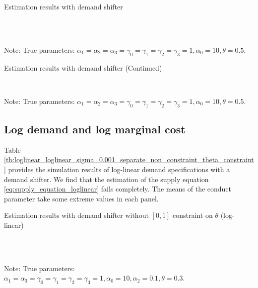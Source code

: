 \documentclass[11pt, a4paper]{article}
\begin{document}
\begin{table}[!htbp]
  \begin{center}
      \caption{Estimation results with demand shifter}
      \label{tb:linear_linear_sigma_1} 
      \subfloat[$\sigma=0.001$]{}\\
      \subfloat[$\sigma=0.5$]{}\\
  \end{center}\footnotesize
  Note: True parameters: $\alpha_1 = \alpha_2 = \alpha_3 = \gamma_0 = \gamma_1 = \gamma_2  = \gamma_3 = 1, \alpha_0 = 10, \theta = 0.5.$
\end{table} 

\begin{table}[!htbp]
  \ContinuedFloat  %
  \begin{center}
      \caption{Estimation results with demand shifter (Continued)}
      \label{tb:linear_linear_sigma_1} 
      \subfloat[$\sigma=1.0$]{}\\
    \subfloat[$\sigma=2.0$]{}
  \end{center}\footnotesize
  Note: True parameters: $\alpha_1 = \alpha_2 = \alpha_3 = \gamma_0 = \gamma_1 = \gamma_2  = \gamma_3 = 1, \alpha_0 = 10, \theta = 0.5.$
\end{table} 


\subsection{Log demand and log marginal cost}
Table \ref{tb:loglinear_loglinear_sigma_0.001_separate_non_constraint_theta_constraint} provides the simulation results of log-linear demand specifications with a demand shifter. 
We find that the estimation of the supply equation \eqref{eq:supply_equation_loglinear} fails completely.
The means of the conduct parameter take some extreme values in each panel.

\begin{table}[!htbp]
  \begin{center}
      \caption{Estimation results with demand shifter without $[0,1]$ constraint on $\theta$ (log-linear)}
      \label{tb:loglinear_loglinear_sigma_0.001_separate_non_constraint_non_constraint} 
      \subfloat[$\sigma=0.001$]{}\\
      \subfloat[$\sigma=0.5$]{}\\
  \end{center}\footnotesize
  Note: True parameters: $\alpha_1 = \alpha_3 = \gamma_0 = \gamma_1 = \gamma_2  = \gamma_3 = 1, \alpha_0 = 10, \alpha_2 = 0.1,  \theta = 0.3.$
\end{table} 
\end{document}
